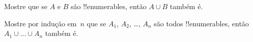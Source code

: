 \documentclass[../../../include/open-logic-section]{subfiles}
\begin{document}
\begin{prob}
Mostre que se $A$ e $B$ são !!{enumerable}s, então $A \cup B$ também é.
\end{prob}

\begin{prob}
Mostre por indução em~$n$ que se $A_1$, $A_2$, \dots, $A_n$ são todos
!!{enumerable}s, então $A_1 \cup \dots \cup A_n$ também é.
\end{prob}
\end{document}
